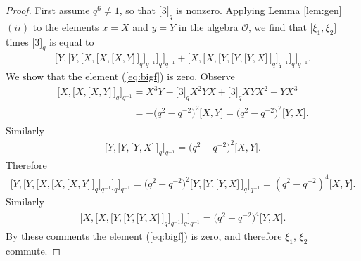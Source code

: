 \documentclass[10pt,a4paper]{amsart}
\numberwithin{equation}{section}
\begin{document}
\begin{proof}
First assume
$q^6 \not=1$, so that
$\lbrack 3 \rbrack_q$ is nonzero.
Applying
Lemma
\ref{lem:gen}$(ii)$ to the elements $x=X$ and $y=Y$ in
the algebra $\mathcal O$, we f\/ind that
$\lbrack \xi_1, \xi_2\rbrack $ times $\lbrack 3\rbrack_q$
is equal to
\begin{gather}
\lbrack Y,
\lbrack Y,
\lbrack X,
\lbrack X,
\lbrack X,
Y
\rbrack \,
\rbrack_q
\rbrack_{q^{-1}}
\rbrack_q
\rbrack_{q^{-1}}
+
\lbrack X,
\lbrack X,
\lbrack Y,
\lbrack Y,
\lbrack Y,
X
\rbrack \,
\rbrack_q
\rbrack_{q^{-1}}
\rbrack_q
\rbrack_{q^{-1}}.
\label{eq:bigf}
\end{gather}
We show that the element (\ref{eq:bigf}) is zero.
Observe
\begin{gather*}
\lbrack X,
\lbrack X,
\lbrack X,
Y
\rbrack \,
\rbrack_q
\rbrack_{q^{-1}}
 =
X^3Y-\lbrack 3\rbrack_q X^2YX+\lbrack 3\rbrack_q XYX^2-YX^3
\\
\phantom{\lbrack X,
\lbrack X,
\lbrack X,
Y
\rbrack \,
\rbrack_q
\rbrack_{q^{-1}}}{} = -\big(q^2-q^{-2}\big)^2 \lbrack X,Y \rbrack
= \big(q^2-q^{-2}\big)^2 \lbrack Y,X \rbrack.
\end{gather*}
Similarly
\begin{gather*}
\lbrack Y,
\lbrack Y,
\lbrack Y,
X
\rbrack \,
\rbrack_q
\rbrack_{q^{-1}}
= \big(q^2-q^{-2}\big)^2 \lbrack X,Y \rbrack.
\end{gather*}
Therefore
\begin{gather*}
\lbrack Y,
\lbrack Y,
\lbrack X,
\lbrack X,
\lbrack X,
Y
\rbrack \,
\rbrack_q
\rbrack_{q^{-1}}
\rbrack_q
\rbrack_{q^{-1}}
 =
\big(q^2-q^{-2}\big)^2\lbrack Y,
\lbrack Y,
\lbrack Y,
X
\rbrack \,
\rbrack_q
\rbrack_{q^{-1}}
=
(q^2-q^{-2})^4\lbrack X,Y\rbrack.
\end{gather*}
Similarly
\begin{gather*}
\lbrack X,
\lbrack X,
\lbrack Y,
\lbrack Y,
\lbrack Y,
X
\rbrack \,
\rbrack_q
\rbrack_{q^{-1}}
\rbrack_q
\rbrack_{q^{-1}}
 =
\big(q^2-q^{-2}\big)^4\lbrack Y,X\rbrack .
\end{gather*}
By these comments
the element (\ref{eq:bigf})
is zero, and therefore
$\xi_1$, $\xi_2$ commute.



\end{proof}
\end{document}

